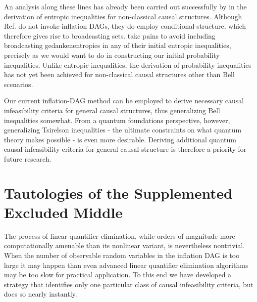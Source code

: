 An analysis along these lines has already been carried out successfully by \citet{Chaves2015infoquantum} in the derivation of entropic inequalities for non-classical causal structures. Although Ref. \citet{Chaves2015infoquantum} do not invoke inflation DAGs, they do employ conditional-structure, which therefore gives rise to broadcasting sets. \citet{Chaves2015infoquantum} take pains to avoid including broadcasting gedankenentropies in any of their initial entropic inequalities, precisely as we would want to do in constructing our initial probability inequalities. Unlike entropic inequalities, the derivation of probability inequalities has not yet been achieved for non-classical causal structures other than Bell scenarios. 

Our current inflation-DAG method can be employed to derive necessary causal infeasibility criteria for general causal structures, thus generalizing Bell inequalities somewhat. From a quantum foundations perspective, however, generalizing Tsirelson inequalities \cite{Tsirelson1980,Brunner2013Bell} - the ultimate constraints on what quantum theory makes possible - is even more desirable. Deriving additional quantum causal infeasibility criteria for general causal structure is therefore a priority for future research.


\section{Tautologies of the Supplemented Excluded Middle}\label{sec:TSEM}

The process of linear quantifier elimination, while orders of magnitude more computationally amenable than its nonlinear variant, is nevertheless nontrivial. When the number of observable random variables in the inflation DAG is too large it may happen than even advanced linear quantifier elimination algorithms may be too slow for practical application. To this end we have developed a strategy that identifies only one particular class of causal infeasibility criteria, but does so nearly instantly.

